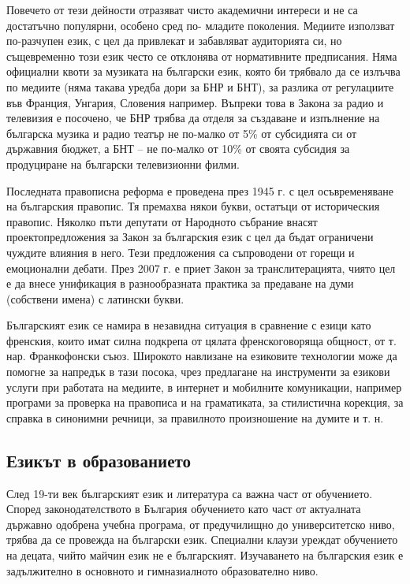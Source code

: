 \documentclass[]{../../metanetpaper}
\begin{document}
\begin{multicols}{2}
Повечето от тези дейности отразяват чисто академични
 интереси и не са достатъчно популярни, особено сред по-
младите поколения. Медиите използват по-разчупен
 език, с цел да привлекат и забавляват аудиторията си, но
 същевременно този език често се отклонява от
 нормативните предписания. Няма официални квоти за
 музиката на български език, която би трябвало да се
 излъчва по медиите (няма такава уредба дори за БНР и
 БНТ), за разлика от регулациите във Франция, Унгария, Словения например. Въпреки това в Закона за радио и телевизия е посочено, че БНР трябва да отделя за създаване и изпълнение на българска музика и радио театър не по-малко от 5\% от субсидията си от държавния
 бюджет, а БНТ – не по-малко от 10\% от своята субсидия
 за продуциране на български телевизионни филми.

Последната правописна реформа е проведена през 1945
 г. с цел осъвременяване на българския правопис. Тя
 премахва някои букви, остатъци от историческия правопис. Няколко пъти депутати от Народното събрание внасят проектопредложения за Закон за българския език с цел да бъдат ограничени чуждите влияния в него. Тези предложения са съпроводени от горещи и емоционални дебати. През 2007 г. е приет Закон за транслитерацията, чиято цел е да внесе унификация в разнообразната практика за предаване на
 думи (собствени имена) с латински букви.

Българският език се намира в незавидна ситуация в
 сравнение с езици като френския, които имат силна подкрепа от цялата френскоговоряща общност, от т. нар.
 Франкофонски съюз. Широкото навлизане на езиковите
 технологии може да помогне за напредък в тази посока,
 чрез предлагане на инструменти за езикови услуги при
 работата на медиите, в интернет и мобилните комуникации, например програми за проверка на правописа
 и на граматиката, за стилистична корекция,
за справка в синонимни
 речници, за правилното произношение на думите и т. н.

\subsection{Езикът в образованието}

След 19-ти век българският език и литература са важна част
 от обучението. Според законодателството в България
 обучението като част от актуалната държавно одобрена
 учебна програма, от предучилищно до университетско
 ниво, трябва да се провежда на български език.
 Специални клаузи уреждат обучението на децата, чийто
 майчин език не е българският. Изучаването на
 българския език е задължително в основното и
 гимназиалното образователно ниво.


\end{multicols}
\end{document}
